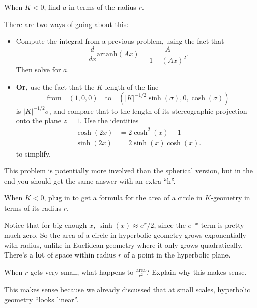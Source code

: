 \documentclass[newpage,hints,handout]{ximera}
\begin{document}
\begin{problem}
  When $K<0$, find $a$ in terms of the radius $r$.
  \begin{hint}
    There are two ways of going about this:
    \begin{itemize}
    \item Compute the integral from a previous problem,  using the fact that
      \[\frac{d}{dx}\mathrm{artanh}(Ax)=\frac{A}{1-(Ax)^2}.\]
      Then solve for $a$.
    \item \textbf{Or,} use the fact that the $K$-length of the line
      $$\text{from}\quad(1,0,0)\quad\text{to}\quad
      (|K|^{-1/2}\sinh(\sigma),0,\cosh(\sigma))$$
      is $|K|^{-1/2}\sigma$, and compare that to the length of its stereographic
      projection onto the plane $z=1$.  Use the identities
      \begin{align*}
        \cosh(2x) &= 2\cosh^2(x)-1 \\
        \sinh(2x) &= 2\sinh(x)\cosh(x).
      \end{align*}
      to simplify.
    \end{itemize}
  \end{hint}
  \begin{hint}
    This problem is potentially more involved than the spherical version, but in
    the end you should get the same answer with an extra ``h''.
  \end{hint}
\end{problem}

\begin{problem}
  When $K<0$, plug in to get a formula for the area of a circle in $K$-geometry
  in terms of its radius $r$.
\end{problem}

Notice that for big enough $x$, $\sinh(x) \approx e^x/2$, since the $e^{-x}$ term
is pretty much zero.  So the area of a circle in hyperbolic geometry grows
exponentially with radius, unlike in Euclidean geometry where it only grows
quadratically.  There's a \textbf{lot} of space within radius $r$ of a point in
the hyperbolic plane.
\begin{problem}
  When $r$ gets very small, what happens to $\frac{\text{area}}{r^2}$?  Explain
  why this makes sense.
  \begin{freeResponse}
    This makes sense because we already discussed that at small scales,
    hyperbolic geometry ``looks linear''.
  \end{freeResponse}
\end{problem}
\end{document}
